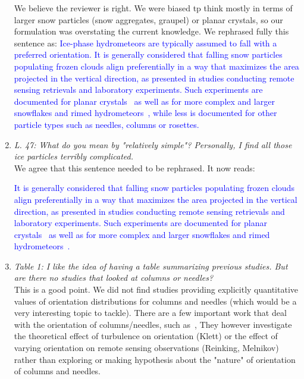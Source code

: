 \documentclass[12pt]{article}
\newcommand*{\blue}{\textcolor{blue}}
\begin{document}
\begin{enumerate}
    We believe the reviewer is right. We were biased tp think mostly in terms of larger snow particles (snow aggregates, graupel) or planar crystals, so our formulation was overstating the current knowledge. We rephrased fully this sentence as:
    \blue{Ice-phase hydrometeors are typically assumed to fall with a preferred orientation. It is generally considered that falling snow particles populating frozen clouds align preferentially in a way that maximizes the area projected in the vertical direction, as presented in studies conducting remote sensing retrievals and laboratory experiments. Such experiments are documented for planar crystals~\cite{Noel_JAMC_2005,Matrosov_JAS_2005,Tinklenberg_JFM_2024} as well as for more complex and larger snowflakes and rimed hydrometeors~\cite{Kennedy_JAMC_2011, Ryzhkov_JAMC_2011, Koebschall_EF_2023}, while less is documented for other particle types such as needles, columns or rosettes. }\\


    \item \textit{L. 47: What do you mean by "relatively simple"? Personally, I find all those ice particles terribly complicated.}\\
    
    We agree that this sentence needed to be rephrased. It now reads:
    
    \blue{ It is generally considered that falling snow particles populating frozen clouds align preferentially in a way that maximizes the area projected in the vertical direction, as presented in studies conducting remote sensing retrievals and laboratory experiments. Such experiments are documented for planar crystals~\cite{Noel_JAMC_2005,Matrosov_JAS_2005,Tinklenberg_JFM_2024} as well as for more complex and larger snowflakes and rimed hydrometeors~\cite{Kennedy_JAMC_2011, Ryzhkov_JAMC_2011, Koebschall_EF_2023}. }\\
    
    \item \textit{Table 1: I like the idea of having a table summarizing previous studies. But are there no studies that looked at columns or needles?}\\

    This is a good point. We did not find studies providing explicitly quantitative values of orientation distributions for columns and needles (which would be a very interesting topic to tackle). There are a few important work that deal with the orientation of columns/needles, such as~\cite{Klett_JAS_1995, Reinking_JAMC_1997, Melnikov_JAOT_2013}, They however investigate the theoretical effect of turbulence on orientation (Klett) or the effect of varying orientation on remote sensing observations (Reinking, Melnikov) rather than exploring or making hypothesis about the "nature" of orientation of columns and needles. 


\end{enumerate}
\end{document}
